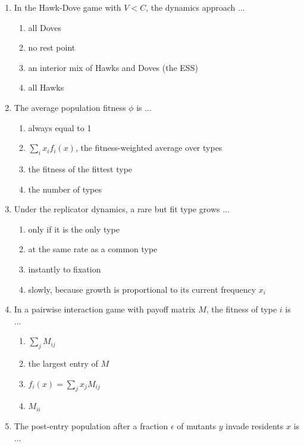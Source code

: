 \documentclass[11pt]{article}
\begin{document}
\begin{enumerate}[itemsep=6pt]
  \begin{enumerate}
    \item a zero sum outcome
    \item a strictly dominant strategy
    \item a symmetric Nash equilibrium
    \item an unstable rest point
  \end{enumerate}
  \item In the Hawk-Dove game with \(V < C\), the dynamics approach ...
  \begin{enumerate}
    \item all Doves
    \item no rest point
    \item an interior mix of Hawks and Doves (the ESS)
    \item all Hawks
  \end{enumerate}
  \item The average population fitness \(\phi\) is ...
  \begin{enumerate}
    \item always equal to 1
    \item \(\sum_i x_i f_i(x)\), the fitness-weighted average over types
    \item the fitness of the fittest type
    \item the number of types
  \end{enumerate}
  \item Under the replicator dynamics, a rare but fit type grows ...
  \begin{enumerate}
    \item only if it is the only type
    \item at the same rate as a common type
    \item instantly to fixation
    \item slowly, because growth is proportional to its current frequency \(x_i\)
  \end{enumerate}
  \item In a pairwise interaction game with payoff matrix \(M\), the fitness of type \(i\) is ...
  \begin{enumerate}
    \item \(\sum_j M_{ij}\)
    \item the largest entry of \(M\)
    \item \(f_i(x) = \sum_j x_j M_{ij}\)
    \item \(M_{ii}\)
  \end{enumerate}
  \item The post-entry population after a fraction \(\epsilon\) of mutants \(y\) invade residents \(x\) is ...

\end{enumerate}
\end{document}
